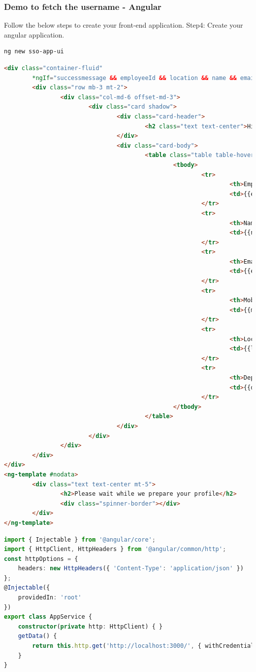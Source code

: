 \documentclass{report}
\begin{document}
\subsubsection*{Demo to fetch the username - Angular}
Follow the below steps to create your front-end application.
Step4: Create your angular application.
\begin{lstlisting}[language=bash]
ng new sso-app-ui
\end{lstlisting}
\begin{lstlisting}[caption=app.component.html, language=HTML]
<div class="container-fluid"
		*ngIf="successmessage && employeeId && location && name && emailId && department && mobileNo; else nodata">
		<div class="row mb-3 mt-2">
				<div class="col-md-6 offset-md-3">
						<div class="card shadow">
								<div class="card-header">
										<h2 class="text text-center">Hi {{successmessage}}!!</h2>
								</div>
								<div class="card-body">
										<table class="table table-hover">
												<tbody>
														<tr>
																<th>Employee Id</th>
																<td>{{employeeId}}</td>
														</tr>
														<tr>
																<th>Name</th>
																<td>{{name}}</td>
														</tr>
														<tr>
																<th>Email Id</th>
																<td>{{emailId}}</td>
														</tr>
														<tr>
																<th>Mobile Number</th>
																<td>{{mobileNo}}</td>
														</tr>
														<tr>
																<th>Location</th>
																<td>{{location}}</td>
														</tr>
														<tr>
																<th>Department</th>
																<td>{{department}}</td>
														</tr>
												</tbody>
										</table>
								</div>
						</div>
				</div>
		</div>
</div>
<ng-template #nodata>
		<div class="text text-center mt-5">
				<h2>Please wait while we prepare your profile</h2>
				<div class="spinner-border"></div>
		</div>
</ng-template>
	\end{lstlisting}

\begin{lstlisting}[caption=app.service.ts, language=Typescript]
import { Injectable } from '@angular/core';
import { HttpClient, HttpHeaders } from '@angular/common/http';
const httpOptions = {
	headers: new HttpHeaders({ 'Content-Type': 'application/json' })
};
@Injectable({
	providedIn: 'root'
})
export class AppService {
	constructor(private http: HttpClient) { }
	getData() {
		return this.http.get('http://localhost:3000/', { withCredentials: true })
	}
}
\end{lstlisting}
\end{document}
